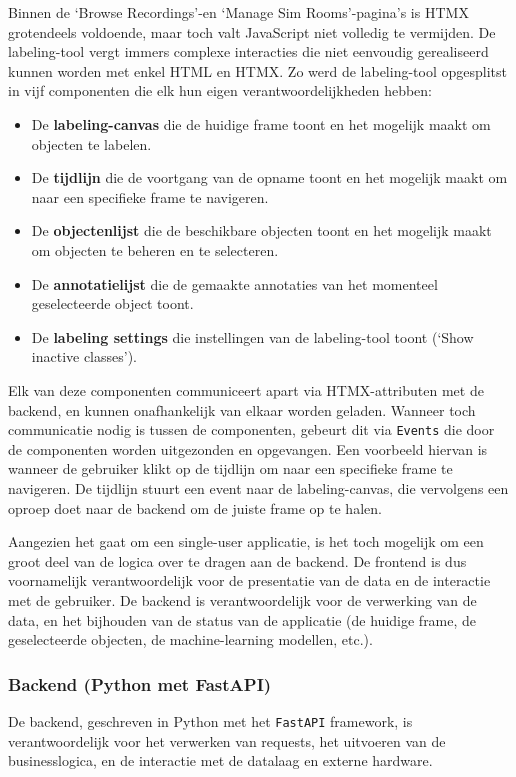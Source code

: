 Binnen de `Browse Recordings'-en `Manage Sim Rooms'-pagina's is HTMX grotendeels voldoende, maar toch valt JavaScript niet volledig te vermijden.
De labeling-tool vergt immers complexe interacties die niet eenvoudig gerealiseerd kunnen worden met enkel HTML en HTMX.
Zo werd de labeling-tool opgesplitst in vijf componenten die elk hun eigen verantwoordelijkheden hebben:
\begin{itemize}
    \item De \textbf{labeling-canvas} die de huidige frame toont en het mogelijk maakt om objecten te labelen.
    \item De \textbf{tijdlijn} die de voortgang van de opname toont en het mogelijk maakt om naar een specifieke frame te navigeren.
    \item De \textbf{objectenlijst} die de beschikbare objecten toont en het mogelijk maakt om objecten te beheren en te selecteren.
    \item De \textbf{annotatielijst} die de gemaakte annotaties van het momenteel geselecteerde object toont.
    \item De \textbf{labeling settings} die instellingen van de labeling-tool toont (`Show inactive classes').
\end{itemize}
Elk van deze componenten communiceert apart via HTMX-attributen met de backend, en kunnen onafhankelijk van elkaar worden geladen.
Wanneer toch communicatie nodig is tussen de componenten, gebeurt dit via \texttt{Events} die door de componenten worden uitgezonden en opgevangen.
Een voorbeeld hiervan is wanneer de gebruiker klikt op de tijdlijn om naar een specifieke frame te navigeren.
De tijdlijn stuurt een event naar de labeling-canvas, die vervolgens een oproep doet naar de backend om de juiste frame op te halen.

Aangezien het gaat om een single-user applicatie, is het toch mogelijk om een groot deel van de logica over te dragen aan de backend.
De frontend is dus voornamelijk verantwoordelijk voor de presentatie van de data en de interactie met de gebruiker.
De backend is verantwoordelijk voor de verwerking van de data, en het bijhouden van de status van de applicatie (de huidige frame, de geselecteerde objecten, de machine-learning modellen, etc.).

\subsubsection{Backend (Python met FastAPI)}

De backend, geschreven in Python met het \texttt{FastAPI} framework, is verantwoordelijk voor het verwerken van requests, 
het uitvoeren van de businesslogica, en de interactie met de datalaag en externe hardware.


